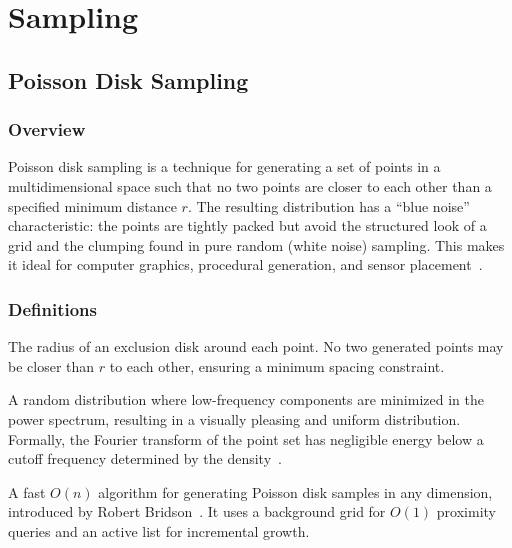 \chapter{Sampling}
\label{ch:sampling}

\section{Poisson Disk Sampling}
\label{sec:poisson_disk_sampling}

\subsection{Overview}
Poisson disk sampling is a technique for generating a set of points in a multidimensional space such that no two points are closer to each other than a specified minimum distance $r$. The resulting distribution has a ``blue noise'' characteristic: the points are tightly packed but avoid the structured look of a grid and the clumping found in pure random (white noise) sampling. This makes it ideal for computer graphics, procedural generation, and sensor placement~\cite{cook1986}.

\subsection{Definitions}
\begin{definition}\label{def:minimum_distance}
The radius of an exclusion disk around each point. No two generated points may be closer than $r$ to each other, ensuring a minimum spacing constraint.
\end{definition}

\begin{definition}\label{def:blue_noise}
A random distribution where low-frequency components are minimized in the power spectrum, resulting in a visually pleasing and uniform distribution. Formally, the Fourier transform of the point set has negligible energy below a cutoff frequency determined by the density~\cite{cook1986}.
\end{definition}

\begin{definition}\label{def:bridson_algorithm}
A fast $O(n)$ algorithm for generating Poisson disk samples in any dimension, introduced by Robert Bridson~\cite{bridson2007}. It uses a background grid for $O(1)$ proximity queries and an active list for incremental growth.
\end{definition}

